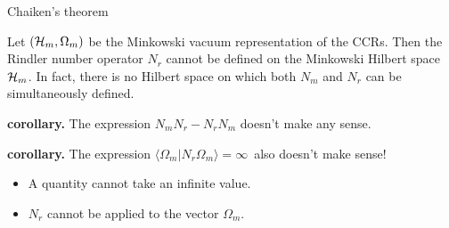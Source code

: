 \documentclass[8pt]{beamer}
\begin{document}
\begin{frame}{Chaiken's theorem}

  Let $(\mathcal H _m,\Omega _{m})$ be the Minkowski vacuum representation of
  the CCRs.  Then the Rindler number operator $N_{r}$ cannot be
  defined on the Minkowski Hilbert space $\mathcal H _m$.  In fact, there is
  no Hilbert space on which both $N_m$ and $N_r$ can be simultaneously
  defined.

  \bigskip \textbf{corollary.} The expression $N_{m}N_{r}-N_{r}N_{m}$
  doesn't make any sense.

  \bigskip \textbf{corollary.} The expression $\langle \Omega
  _{m}|N_{r}\Omega _{m}\rangle =\infty \,$ also doesn't make sense!

\end{frame}

\begin{frame}{ }

  \begin{itemize}
\item A quantity cannot take an infinite value.
\item $N_r$ cannot be applied to the vector $\Omega _m$.
\end{itemize}

\end{frame}
\end{document}
